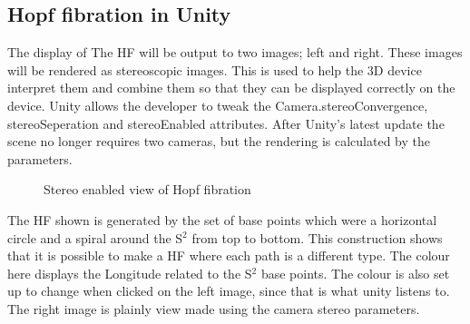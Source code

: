\documentclass[12pt]{article} %
\begin{document}
\begin{flushleft}
\subsection{Hopf fibration in Unity} %
The display of The HF will be output to two images; left and right. These images will be rendered as stereoscopic images. This is used to help the 3D device interpret them and combine them so that they can be displayed correctly on the device. Unity allows the developer to tweak the Camera.stereoConvergence, stereoSeperation and stereoEnabled attributes. After Unity’s latest update the scene no longer requires two cameras, but the rendering is calculated by the parameters.
\begin{figure}[H] %
\caption{Stereo enabled view of Hopf fibration}
\label{fig:speciation}
\end{figure}
The HF shown is generated by the set of base points which were a horizontal circle and a spiral around the S$^{2}$ from top to bottom. This construction shows that it is possible to make a HF where each path is a different type. 
The colour here displays the Longitude related to the S$^{2}$ base points. The colour is also set up to change when clicked on the left image, since that is what unity listens to. The right image is plainly view made using the camera stereo parameters.
\newpage

\end{flushleft}
\end{document}
